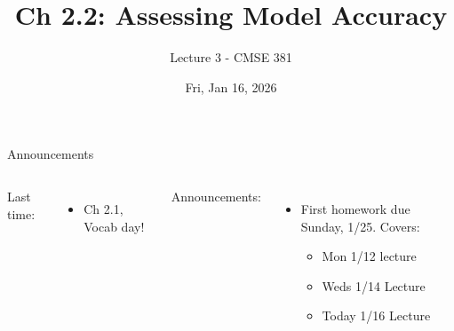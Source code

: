 \documentclass[aspectratio=169,usenames,dvipsnames]{beamer}
\begin{document}
\title[Lec 2]{Ch 2.2: Assessing Model Accuracy}
\subtitle{Lecture 3 - CMSE 381}
\date{Fri, Jan 16, 2026}




\begin{frame}
 \titlepage


\end{frame}
\begin{frame}[c]{Announcements}

\begin{columns}
\centering

	Last time:
	\begin{itemize}
		\item Ch 2.1, Vocab day!
	\end{itemize}
\centering

	Announcements: 
	\begin{itemize}
		\item First homework due Sunday, 1/25. Covers:
		\begin{itemize}
			\item Mon 1/12 lecture
			\item Weds 1/14 Lecture
			\item Today 1/16 Lecture
		\end{itemize}
		\end{itemize}
\end{columns}

\end{frame}
\end{document}
